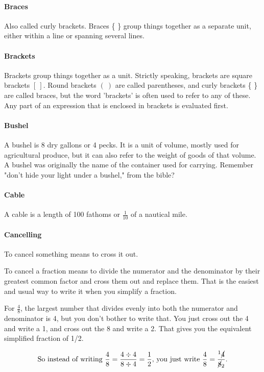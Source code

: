 \documentclass[12pt]{article}
\begin{document}
\paragraph{Braces}
Also called curly brackets. Braces \{ \} group things together as a separate unit, either within a line or spanning several lines.

\paragraph{Brackets}
Brackets group things together as a unit. Strictly speaking, brackets are square brackets $[ \ ]$. Round brackets $( \ )$ are called parentheses, and curly brackets \{ \} are called braces, but the word 'brackets' is often used to refer to any of these. Any part of an expression that is enclosed in brackets is evaluated first.

\paragraph{Bushel}
A bushel is 8 dry gallons or 4 pecks. It is a unit of volume, mostly used for agricultural produce, but it can also refer to the weight of goods of that volume.
A bushel was originally the name of the container used for carrying. Remember "don't hide your light under a bushel," from the bible?

\paragraph{Cable}
A cable is a length of 100 fathoms or $\frac{1}{10}$ of a nautical mile.

\paragraph{Cancelling}
To cancel something means to cross it out.

To cancel a fraction means to divide the numerator and the denominator by their greatest common factor and cross them out and replace them. That is the easiest and usual way to write it when you simplify a fraction.

For $\frac{4}{8}$, the largest number that divides evenly into both the numerator and denominator is 4, but you don't bother to write that. You just cross out the 4 and write a 1, and cross out the 8 and write a 2. That gives you the equivalent simplified fraction of 1/2.

$$\text{So instead of writing }\frac{4}{8} = \frac{4 \div 4}{8 \div 4} = \frac{1}{2}\text{, you just write }\frac{4}{8} = \frac{^1 \cancel{4}}{\cancel{8}_2}\text{.}$$
\end{document}
